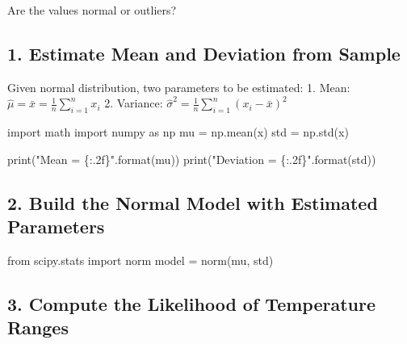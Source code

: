 \documentclass[
  letterpaper,
]{scrbook}
\newenvironment{Shaded}{\begin{snugshade}}{\end{snugshade}}
\newcommand{\BuiltInTok}[1]{\textcolor[rgb]{0.00,0.23,0.31}{#1}}
\newcommand{\ImportTok}[1]{\textcolor[rgb]{0.00,0.46,0.62}{#1}}
\newcommand{\NormalTok}[1]{\textcolor[rgb]{0.00,0.23,0.31}{#1}}
\newcommand{\OperatorTok}[1]{\textcolor[rgb]{0.37,0.37,0.37}{#1}}
\newcommand{\SpecialCharTok}[1]{\textcolor[rgb]{0.37,0.37,0.37}{#1}}
\newcommand{\StringTok}[1]{\textcolor[rgb]{0.13,0.47,0.30}{#1}}
\begin{document}
Are the values normal or outliers?

\subsection*{1. Estimate Mean and Deviation from
Sample}\label{estimate-mean-and-deviation-from-sample}

Given normal distribution, two parameters to be estimated: 1. Mean:
\(\hat{\mu} = \bar{x} = \frac{1}{n} \sum_{i=1}^{n} x_i\) 2. Variance:
\(\hat{\sigma}^2 = \frac{1}{n} \sum_{i=1}^{n} (x_i - \bar{x})^2\)

\begin{Shaded}
\begin{Highlighting}[]
\ImportTok{import}\NormalTok{ math}
\ImportTok{import}\NormalTok{ numpy }\ImportTok{as}\NormalTok{ np}
\NormalTok{mu }\OperatorTok{=}\NormalTok{ np.mean(x)}
\NormalTok{std }\OperatorTok{=}\NormalTok{ np.std(x)}
\end{Highlighting}
\end{Shaded}

\begin{Shaded}
\begin{Highlighting}[]
\BuiltInTok{print}\NormalTok{(}\StringTok{"Mean = }\SpecialCharTok{\{:.2f\}}\StringTok{"}\NormalTok{.}\BuiltInTok{format}\NormalTok{(mu))}
\BuiltInTok{print}\NormalTok{(}\StringTok{"Deviation = }\SpecialCharTok{\{:.2f\}}\StringTok{"}\NormalTok{.}\BuiltInTok{format}\NormalTok{(std))}
\end{Highlighting}
\end{Shaded}

\subsection*{2. Build the Normal Model with Estimated
Parameters}\label{build-the-normal-model-with-estimated-parameters}

\begin{Shaded}
\begin{Highlighting}[]
\ImportTok{from}\NormalTok{ scipy.stats }\ImportTok{import}\NormalTok{ norm}
\NormalTok{model }\OperatorTok{=}\NormalTok{ norm(mu, std)}
\end{Highlighting}
\end{Shaded}

\subsection*{3. Compute the Likelihood of Temperature
Ranges}\label{compute-the-likelihood-of-temperature-ranges}
\end{document}
